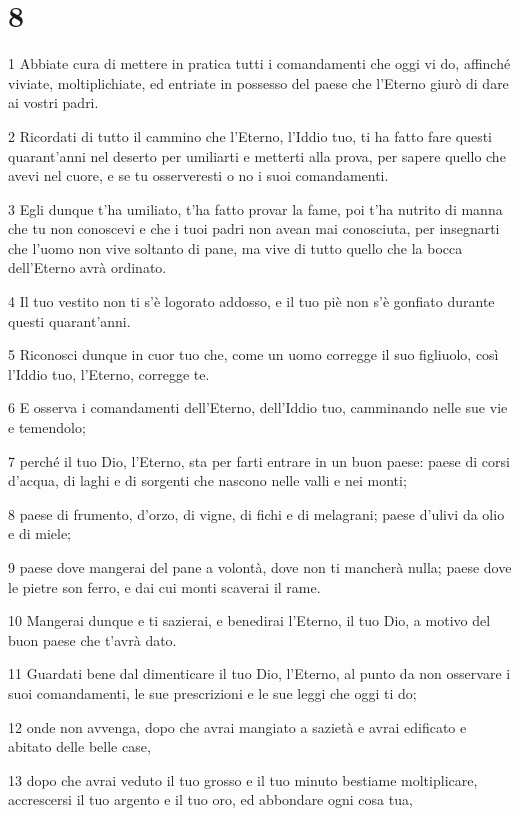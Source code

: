 \chapter{8}

\par 1 Abbiate cura di mettere in pratica tutti i comandamenti che oggi vi do, affinché viviate, moltiplichiate, ed entriate in possesso del paese che l'Eterno giurò di dare ai vostri padri.
\par 2 Ricordati di tutto il cammino che l'Eterno, l'Iddio tuo, ti ha fatto fare questi quarant'anni nel deserto per umiliarti e metterti alla prova, per sapere quello che avevi nel cuore, e se tu osserveresti o no i suoi comandamenti.
\par 3 Egli dunque t'ha umiliato, t'ha fatto provar la fame, poi t'ha nutrito di manna che tu non conoscevi e che i tuoi padri non avean mai conosciuta, per insegnarti che l'uomo non vive soltanto di pane, ma vive di tutto quello che la bocca dell'Eterno avrà ordinato.
\par 4 Il tuo vestito non ti s'è logorato addosso, e il tuo piè non s'è gonfiato durante questi quarant'anni.
\par 5 Riconosci dunque in cuor tuo che, come un uomo corregge il suo figliuolo, così l'Iddio tuo, l'Eterno, corregge te.
\par 6 E osserva i comandamenti dell'Eterno, dell'Iddio tuo, camminando nelle sue vie e temendolo;
\par 7 perché il tuo Dio, l'Eterno, sta per farti entrare in un buon paese: paese di corsi d'acqua, di laghi e di sorgenti che nascono nelle valli e nei monti;
\par 8 paese di frumento, d'orzo, di vigne, di fichi e di melagrani; paese d'ulivi da olio e di miele;
\par 9 paese dove mangerai del pane a volontà, dove non ti mancherà nulla; paese dove le pietre son ferro, e dai cui monti scaverai il rame.
\par 10 Mangerai dunque e ti sazierai, e benedirai l'Eterno, il tuo Dio, a motivo del buon paese che t'avrà dato.
\par 11 Guardati bene dal dimenticare il tuo Dio, l'Eterno, al punto da non osservare i suoi comandamenti, le sue prescrizioni e le sue leggi che oggi ti do;
\par 12 onde non avvenga, dopo che avrai mangiato a sazietà e avrai edificato e abitato delle belle case,
\par 13 dopo che avrai veduto il tuo grosso e il tuo minuto bestiame moltiplicare, accrescersi il tuo argento e il tuo oro, ed abbondare ogni cosa tua,
